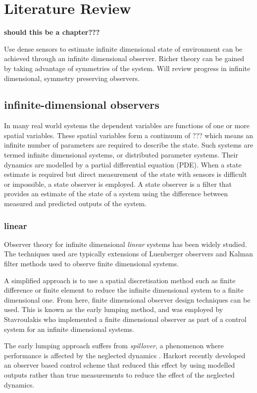 \section{Literature Review}
\textbf{should this be a chapter???}

Use dense sensors to estimate infinite dimensional state of environment can be achieved through an infinite dimensional observer. Richer theory can be gained by taking advantage of symmetries of the system. Will review progress in infinite dimensional, symmetry preserving observers.

\subsection{infinite-dimensional observers}
In many real world systems the dependent variables are functions of one or more spatial variables. These spatial variables form a continuum of ??? which means an infinite number of parameters are required to describe the state. Such systems are termed infinite dimensional systems, or distributed parameter systems. Their dynamics are modelled by a partial differential equation (PDE). When a state estimate is required but direct measurement of the state with sensors is difficult or impossible, a state observer is employed. A state observer is a filter that provides an estimate of the state of a system using the difference between measured and predicted outputs of the system.

\subsubsection{linear}
Observer theory for infinite dimensional \textit{linear} systems has been widely studied. The techniques used are typically extensions of Luenberger observers and Kalman filter methods used to observe finite dimensional systems.

A simplified approach is to use a spatial discretisation method such as finite difference or finite element to reduce the infinite dimensional system to a finite dimensional one. From here, finite dimensional observer design techniques can be used. This is known as the early lumping method, and was employed by Stavroulakis \cite{stavroulakis1973design} who implemented a finite dimensional observer as part of a control system for an infinite dimensional systems.

The early lumping approach suffers from \textit{spillover}, a phenomenon where performance is affected by the neglected dynamics \cite{meirovitch1983problem}. Harkort \cite{harkort2011finite} recently developed an observer based control scheme that reduced this effect by using modelled outputs rather than true measurements to reduce the effect of the neglected dynamics.

